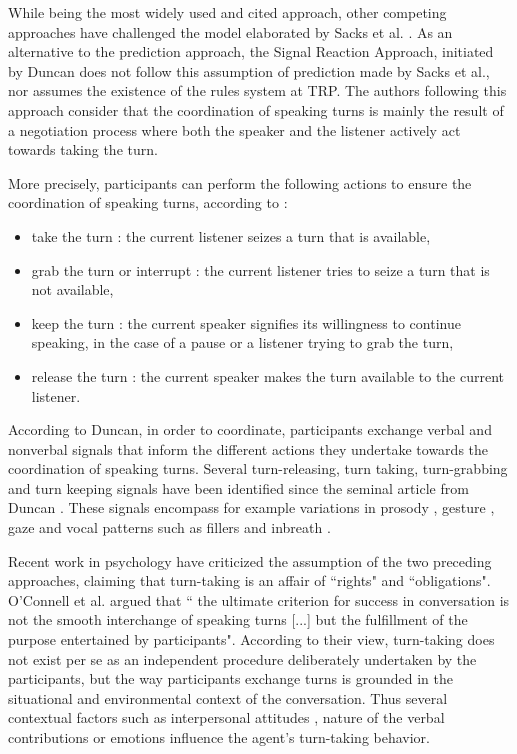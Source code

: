 While being the most widely used and cited approach, other competing approaches have challenged the model elaborated by Sacks et al. \citep{sacks_simplest_1974}.
As an alternative to the prediction approach, the Signal Reaction Approach, initiated by Duncan \citep{duncan_signals_1972} does not follow this assumption of prediction made by Sacks et al., nor assumes
the existence of the rules system at TRP. 
The authors following this approach consider that the coordination of speaking turns is mainly
the result of a negotiation process where both the speaker
and the listener actively act towards taking the turn.

More precisely, participants can perform the following actions to ensure the coordination of speaking turns, according to \citep{bunt_dimensions_2006}  : \begin{itemize}
	\item take the turn : the current listener seizes a turn that is available,
	\item grab the turn or interrupt : the current listener tries to seize a turn that is not available,
	\item keep the turn : the current speaker signifies its willingness to continue speaking, in the case of a pause or a listener trying to grab the turn,
	\item release the turn : the current speaker makes the turn available to the current listener.
\end{itemize}

According to Duncan, in order to coordinate, participants exchange verbal and nonverbal signals that inform the different actions they undertake towards the coordination of speaking turns. 
Several turn-releasing, turn taking, turn-grabbing and turn keeping signals have been identified since the seminal article from Duncan \citep{duncan_signals_1972}. These signals encompass for example variations in prosody \citep{duncan_signals_1972,gravano_turn-taking_2011,hjalmarsson_additive_2011}, gesture \citep{duncan_signals_1972,mondada_multimodal_2007}, gaze \citep{kendon_functions_1967,novick_coordinating_1996,oertel_gaze_2013} and vocal patterns 
such as fillers \citep{benus_pragmatic_2011} and inbreath \citep{torreira_breathing_2015}.  

Recent work in psychology have criticized
the assumption of the two preceding approaches, claiming that turn-taking is an affair of ``rights" and ``obligations". O'Connell et al.\citep{oconnell_turn-taking_1990} argued that `` the ultimate criterion for success in conversation is not the smooth interchange of speaking
turns [...] but the fulfillment of the purpose entertained
by participants". According to their view, turn-taking
does not exist per se as an independent procedure deliberately
undertaken by the participants, but the way
participants exchange turns is grounded in the situational
and environmental context of the conversation.
Thus several contextual factors such as interpersonal attitudes \citep{ter_maat_how_2010}, nature of the verbal contributions \citep{clark_using_1996,cafaro_effects_2016} or emotions \citep{goldberg_interrupting_1990} influence the agent's turn-taking behavior. 

